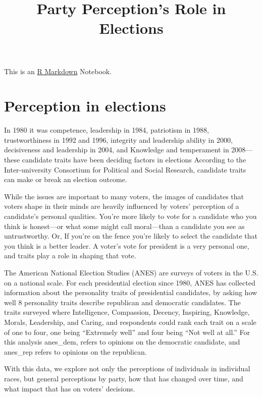 \documentclass[
]{article}
\title{Party Perception's Role in Elections}
\author{}
\date{\vspace{-2.5em}}
\begin{document}
\maketitle

This is an \href{http://rmarkdown.rstudio.com}{R Markdown} Notebook.

\hypertarget{perception-in-elections}{%
\section{Perception in elections}\label{perception-in-elections}}

In 1980 it was competence, leadership in 1984, patriotism in 1988,
trustworthiness in 1992 and 1996, integrity and leadership ability in
2000, decisiveness and leadership in 2004, and Knowledge and temperament
in 2008---these candidate traits have been deciding factors in elections
According to the Inter-university Consortium for Political and Social
Research, candidate traits can make or break an election outcome.

While the issues are important to many voters, the images of candidates
that voters shape in their minds are heavily influenced by voters'
perception of a candidate's personal qualities. You're more likely to
vote for a candidate who you think is honest---or what some might call
moral---than a candidate you see as untrustworthy. Or, If you're on the
fence you're likely to select the candidate that you think is a better
leader. A voter's vote for president is a very personal one, and traits
play a role in shaping that vote.

The American National Election Studies (ANES) are surveys of voters in
the U.S. on a national scale. For each presidential election since 1980,
ANES has collected information about the personality traits of
presidential candidates, by asking how well 8 personality traits
describe republican and democratic candidates. The traits surveyed where
Intelligence, Compassion, Decency, Inspiring, Knowledge, Morals,
Leadership, and Caring, and respondents could rank each trait on a scale
of one to four, one being ``Extremely well'' and four being ``Not well
at all.'' For this analysis anes\_dem, refers to opinions on the
democratic candidate, and anes\_rep refers to opinions on the
republican.

With this data, we explore not only the perceptions of individuals in
individual races, but general perceptions by party, how that has changed
over time, and what impact that has on voters' decisions.
\end{document}
